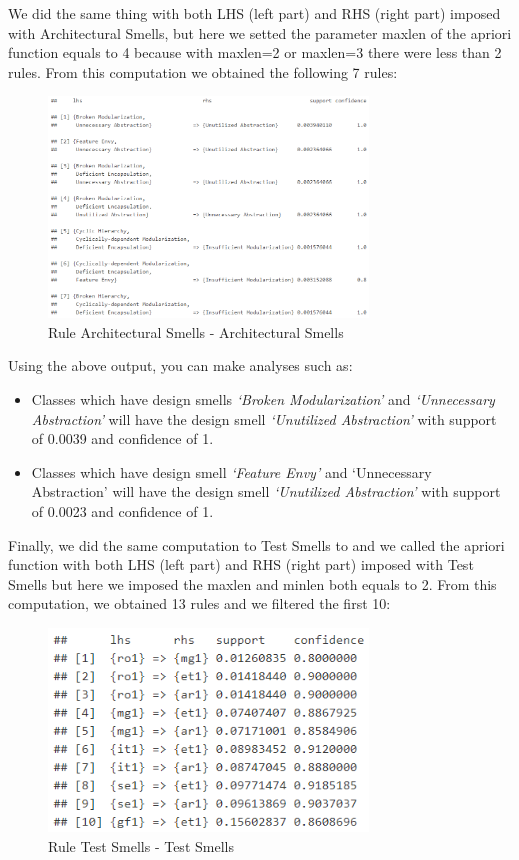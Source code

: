 We did the same thing with both LHS (left part) and RHS (right part) imposed with Architectural Smells, but here we setted the parameter maxlen of the apriori function equals to 4 because with maxlen=2 or maxlen=3 there were less than 2 rules. From this computation we obtained the following 7 rules: \par
\begin{figure}[htp]
    \centering
    \includegraphics[width=8.5cm]{img/ruleArch.PNG}
    \caption{Rule Architectural Smells - Architectural Smells}
    \label{fig:ruleArch}
\end{figure}
Using the above output, you can make analyses such as:
\begin{itemize}
  \item Classes which have design smells \textit{‘Broken Modularization’} and \textit{‘Unnecessary Abstraction’} will have the design smell \textit{‘Unutilized Abstraction’} with support of 0.0039 and confidence of 1.
  \item Classes which have design smell \textit{‘Feature Envy’} and ‘Unnecessary Abstraction’ will have the design smell \textit{‘Unutilized Abstraction’} with support of 0.0023 and confidence of 1.
\end{itemize}

Finally, we did the same computation to Test Smells to and we called the apriori function with both LHS (left part) and RHS (right part) imposed with Test Smells but here we imposed the maxlen and minlen both equals to 2. From this computation, we obtained 13 rules and we filtered the first 10:
\begin{figure}[htp]
    \centering
    \includegraphics[width=8.5cm]{img/ruleTest.PNG}
    \caption{Rule Test Smells - Test Smells}
    \label{fig:ruleTest}
\end{figure}

